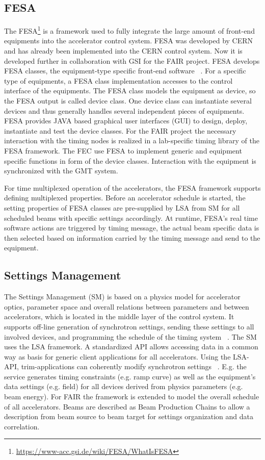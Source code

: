 \subsection{FESA}
The \gls{FESA}\footnote{\url{https://www-acc.gsi.de/wiki/FESA/WhatIsFESA}} is a framework used to fully integrate the large amount of front-end equipments into the accelerator control system. FESA was developed by CERN and has already been implemented into the \gls{CERN} control system. Now it is developed further in collaboration with GSI for the FAIR project. FESA develops FESA classes, the equipment-type specific front-end software ~\cite{hoffmann_fesafront-end_2008}. For a specific type of equipments, a FESA class implementation accesses to the control interface of the equipments. The FESA class models the equipment as device, so the FESA output is called device class. One device class can instantiate several devices and thus generally handles several independent pieces of equipments.  FESA provides JAVA based graphical user interfaces (GUI) to design, deploy, instantiate and test the device classes. For the FAIR project the necessary interaction with the timing nodes is realized in a lab-specific timing library of the FESA framework.
The FEC use FESA to implement generic and equipment specific functions in form of the device classes. Interaction with the equipment is synchronized with the GMT system. 

For time multiplexed operation of the accelerators, the FESA framework supports defining multiplexed properties. Before an accelerator schedule is started, the setting properties of FESA classes are pre-supplied by LSA from SM for all scheduled beams with specific settings accordingly. At runtime, FESA’s real time software actions are triggered by timing message, the actual beam specific data is then selected based on information carried by the timing message and send to the equipment. 

\subsection{Settings Management}
The Settings Management (\gls{SM}) is based on a physics model for accelerator optics, parameter space and overall relations between parameters and between accelerators, which is located in the middle layer of the control system. It supports off-line generation of synchrotron settings, sending these settings to all involved devices, and programming the schedule of the timing system ~\cite{huhmann_fair_2013}. The SM uses the LSA framework. A standardized \gls{API} allows accessing data in a common way as basis for generic client applications for all accelerators. Using the LSA-API, trim-applications can coherently modify synchrotron settings ~\cite{huhmann_fair_2013}. E.g. the service generates timing constraints (e.g. ramp curve) as well as the equipment’s data settings (e.g. field) for all devices derived from physics parameters (e.g. beam energy). For FAIR the framework is extended to model the overall schedule of all accelerators. Beams are described as Beam Production Chains to allow a description from beam source to beam target for settings organization and data correlation.

